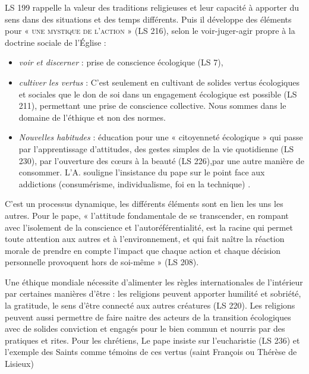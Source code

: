 LS 199 rappelle la valeur des traditions religieuses et leur capacité à apporter du sens dans des situations et des temps différents. Puis il développe des éléments pour « \textsc{une mystique de l’action} » (LS 216), selon le voir-juger-agir propre à la doctrine sociale de l’Église  : 
\begin{itemize}
    \item \textit{voir et discerner } : prise  de conscience écologique (LS 7),
    \item \textit{cultiver les vertus} : C’est seulement en cultivant de solides vertus écologiques et sociales que le don de soi dans un engagement écologique est possible (LS 211), permettant une prise de conscience collective. Nous sommes dans le domaine de l'éthique et non des normes.
    \item \textit{Nouvelles habitudes} :  éducation pour une « citoyenneté écologique » qui passe par l’apprentissage d’attitudes, des gestes simples de la vie quotidienne (LS 230), par l’ouverture des cœurs à la beauté (LS 226),par une autre manière de consommer. L'A. souligne l'insistance du pape sur le point face aux addictions (consumérisme, individualisme, foi en la technique) .
\end{itemize}
C'est un processus dynamique, les différents éléments sont en lien les uns les autres.
 Pour le pape, « l’attitude fondamentale de se transcender, en rompant avec l’isolement de la conscience et l’autoréférentialité, est la racine qui permet toute attention aux autres et à l’environnement, et qui fait naître la réaction morale de prendre en compte l’impact que chaque action et chaque décision personnelle provoquent hors de soi-même » (LS 208). 
\begin{comment}
    est ce le christianisme ou de toute religion hétéronome par essence ? 
\end{comment}
 

Une éthique mondiale nécessite d'alimenter les règles internationales de l'intérieur par certaines manières d'être : les religions peuvent apporter humilité et sobriété, la gratitude, le sens d'être connecté aux autres créatures (LS 220).
Les religions peuvent aussi permettre de faire naitre des acteurs de la transition écologiques avec de solides conviction et engagés pour le bien commun et nourris par des pratiques et rites.
Pour les chrétiens, Le pape insiste sur l'eucharistie  (LS 236) et l'exemple des Saints comme témoins de ces vertus (saint François ou Thérèse de Lisieux) 

